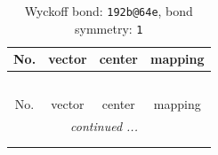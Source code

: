 \documentclass[fleqn,8pt]{jsarticle}
\begin{document}
\renewcommand{\arraystretch}{1.2}
\begin{longtable}{cccc}
\caption{Wyckoff bond: {\tt 192b@64e}, bond symmetry: {\tt 1}}
 \\
 \hline \hline
No. & vector & center & mapping \\ \hline \endfirsthead

\multicolumn{3}{l}{\tablename\ \thetable{}} \\
 \hline \hline
No. & vector & center & mapping \\ \hline \endhead

 \hline \hline
\multicolumn{3}{r}{\footnotesize\it continued ...} \\ \endfoot

 \hline \hline
\multicolumn{3}{r}{} \\ \endlastfoot


\end{longtable}
\end{document}

